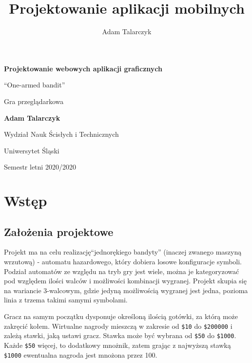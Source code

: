 \documentclass[a4paper,11pt,titlepage]{article}
\author{Adam Talarczyk}
\title{Projektowanie aplikacji mobilnych}
\begin{document}
\begin{titlepage}
    \begin{center}
        \vspace*{1cm}
 
        \Huge
        \textbf{Projektowanie webowych aplikacji graficznych}
 
        \vspace{0.5cm}
        \LARGE
        ``One-armed bandit''


Gra przeglądarkowa
 
        \vspace{1.5cm}
 
        \textbf{Adam Talarczyk}
 
        \vfill
 
        \vspace{0.8cm}
 
        \Large
        Wydział Nauk Ścisłych i Technicznych

        Uniwersytet Śląski

	Semestr letni 2020/2020
 
    \end{center}
\end{titlepage}
\newpage
\tableofcontents
\newpage

\section{Wstęp}
\subsection{Założenia projektowe}
Projekt ma na celu realizację``jednorękiego bandyty'' (inaczej zwanego maszyną wrzutową) - automatu hazardowego, który dobiera losowe konfiguracje symboli. Podział automatów ze względu na tryb gry jest wiele, można je kategoryzować pod względem ilości walców i możliwości kombinacji wygranej. Projekt skupia się na wariancie 3-walcowym, gdzie jedyną możliwością wygranej jest jedna, pozioma linia z trzema takimi samymi symbolami.

Gracz na samym początku dysponuje określoną ilością gotówki, za którą może zakręcić kołem. Wirtualne nagrody mieszczą w zakresie od \verb|$10| do \verb|$200000| i zależą stawki, jaką ustawi gracz. Stawka może być wybrana od \verb|$50| do \verb|$1000|. Każde \verb|$50| więcej, to dodatkowy mnożnik, zatem grając z najwyższą stawką \verb|$1000| ewentualna nagroda jest mnożona przez 100.
\end{document}

